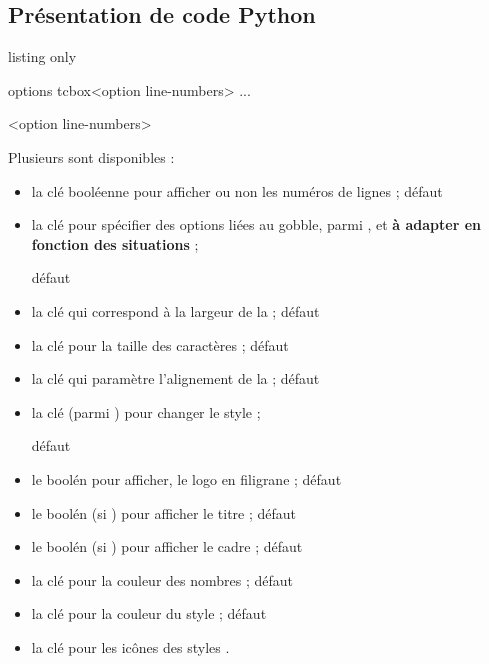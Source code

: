 \subsection{Présentation de code Python}

\begin{PresCodeTexPL}{listing only}
\begin{CodePiton}[clés]{options tcbox}<option line-numbers>
...
\end{CodePiton}


<option line-numbers>
\end{PresCodeTexPL}

\begin{cautionblock}
Plusieurs  sont disponibles :

\begin{itemize}
	\item la clé booléenne  pour afficher ou non les numéros de lignes ; \hfill{}défaut 
	\item {} la clé  pour spécifier des options liées au \textsf{gobble}, parmi , et \textbf{à adapter en fonction des situations} ;
	
	\hfill{}défaut 
	\item la clé  qui correspond à la largeur de la  ; \hfill{}défaut 
	\item la clé  pour la taille des caractères ; \hfill{}défaut 
	\item la clé  qui paramètre l'alignement de la  ;  \hfill{}défaut 
	\item {} la clé  (parmi ) pour changer le style ;
	
	\hfill{}défaut 
	\item {} le boolén  pour afficher, le logo {\small \faPython} en filigrane ; \hfill{}défaut 
	\item {} le boolén  (si ) pour afficher le titre ; \hfill{}défaut 
	\item {} le boolén  (si ) pour afficher le cadre ; \hfill{}défaut 
	\item {} la clé  pour la couleur des nombres ; \hfill{}défaut 
	\item {} la clé  pour la couleur du style  ; \hfill{}défaut 
	\item {} la clé  pour les icônes des styles .
\end{itemize}
\vspace*{-\baselineskip}\leavevmode
\end{cautionblock}

